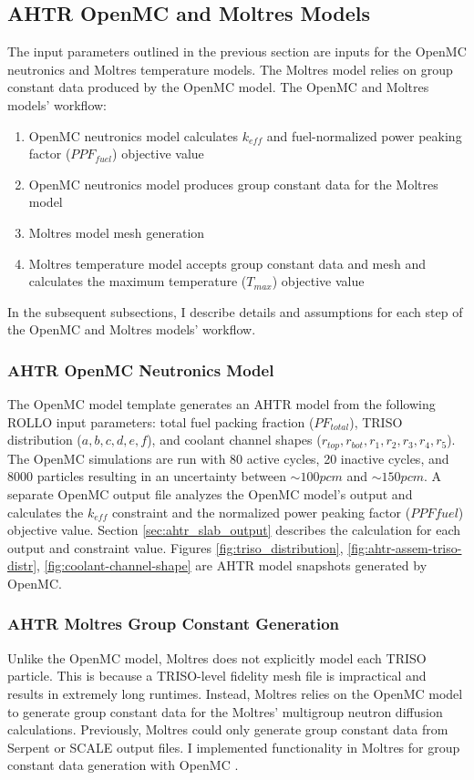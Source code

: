 \subsection{AHTR OpenMC and Moltres Models}
\label{sec:ahtr-moltres-hom}
The input parameters outlined in the previous section are inputs for 
the OpenMC neutronics and Moltres temperature models. 
The Moltres model relies on group constant data produced by the OpenMC model. 
The OpenMC and Moltres models' workflow:  
\begin{enumerate}
\item OpenMC neutronics model calculates $k_{eff}$ and fuel-normalized 
power peaking factor ($PPF_{fuel}$) objective value
\item OpenMC neutronics model produces group constant data for the Moltres 
model
\item Moltres model mesh generation 
\item Moltres temperature model accepts group constant data and mesh and calculates 
      the maximum temperature ($T_{max}$) objective value
\end{enumerate}
In the subsequent subsections, I describe details and assumptions for each step of 
the OpenMC and Moltres models' workflow.

\subsubsection{AHTR OpenMC Neutronics Model}
The OpenMC model template generates an \gls{AHTR} model from the following \gls{ROLLO} 
input parameters: 
total fuel packing fraction ($PF_{total}$), TRISO distribution ($a, b, c, d, e, f$), 
and coolant channel shapes ($r_{top}, r_{bot}, r_1, r_2, r_3, r_4, r_5$).
The OpenMC simulations are run with 80 active cycles, 20 inactive cycles, and 8000 
particles resulting in an uncertainty between $\sim 100pcm$ and $\sim 150pcm$.
A separate OpenMC output file analyzes the OpenMC model's output and 
calculates the $k_{eff}$ constraint and the normalized power 
peaking factor ($PPF{fuel}$) objective value.
Section \ref{sec:ahtr_slab_output} describes the calculation for each output and 
constraint value.
Figures \ref{fig:triso_distribution}, \ref{fig:ahtr-assem-triso-distr},
\ref{fig:coolant-channel-shape} are \gls{AHTR} model snapshots generated by OpenMC. 

\subsubsection{AHTR Moltres Group Constant Generation}
\label{sec:ahtr-moltres-group-constant-gen}
Unlike the OpenMC model, Moltres does not explicitly model each \gls{TRISO}
particle. 
This is because a TRISO-level fidelity mesh file is impractical and results in
extremely long runtimes. 
Instead, Moltres relies on the OpenMC model to generate group constant data for the 
Moltres' multigroup neutron diffusion calculations. 
Previously, Moltres could only generate group constant data from Serpent 
\cite{leppanen_serpent_2014} or SCALE \cite{bucholz_scale:_1982} output files. 
I implemented functionality in Moltres for group constant data generation with 
OpenMC \cite{lindsay_moltres_2017}. 

